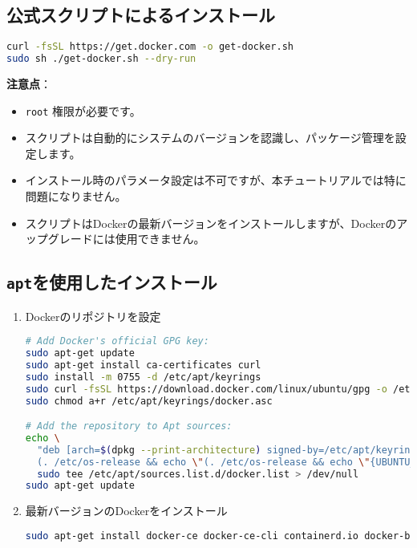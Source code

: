 \subsection{公式スクリプトによるインストール}
\begin{lstlisting}[language=bash]
curl -fsSL https://get.docker.com -o get-docker.sh
sudo sh ./get-docker.sh --dry-run
\end{lstlisting}
\textbf{注意点}：
\begin{itemize}
    \item \texttt{root} 権限が必要です。
    \item スクリプトは自動的にシステムのバージョンを認識し、パッケージ管理を設定します。
    \item インストール時のパラメータ設定は不可ですが、本チュートリアルでは特に問題になりません。
    \item スクリプトはDockerの最新バージョンをインストールしますが、Dockerのアップグレードには使用できません。
\end{itemize}

\subsection{\texttt{apt}を使用したインストール}
\begin{enumerate}
    \item Dockerのリポジトリを設定
\begin{lstlisting}[language=bash]
# Add Docker's official GPG key:
sudo apt-get update
sudo apt-get install ca-certificates curl
sudo install -m 0755 -d /etc/apt/keyrings
sudo curl -fsSL https://download.docker.com/linux/ubuntu/gpg -o /etc/apt/keyrings/docker.asc
sudo chmod a+r /etc/apt/keyrings/docker.asc

# Add the repository to Apt sources:
echo \
  "deb [arch=$(dpkg --print-architecture) signed-by=/etc/apt/keyrings/docker.asc] https://download.docker.com/linux/ubuntu \
  (. /etc/os-release && echo \"(. /etc/os-release && echo \"{UBUNTU_CODENAME:-$VERSION_CODENAME}\") stable" | \
  sudo tee /etc/apt/sources.list.d/docker.list > /dev/null
sudo apt-get update
\end{lstlisting}

    \item 最新バージョンのDockerをインストール
\begin{lstlisting}[language=bash]
sudo apt-get install docker-ce docker-ce-cli containerd.io docker-buildx-plugin docker-compose-plugin
\end{lstlisting}
\end{enumerate}

